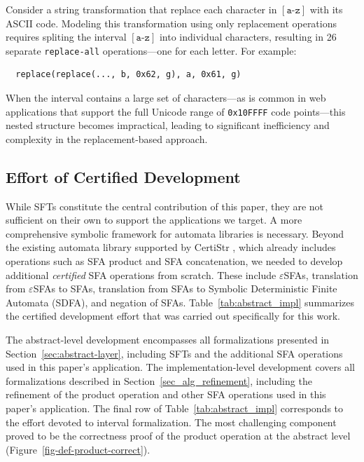 Consider a string transformation that replace each character in $[\texttt{a-z}]$ with its ASCII code. Modeling this transformation using only replacement operations requires spliting the interval $[\texttt{a-z}]$ into individual characters, resulting in 26 separate \texttt{replace-all} operations—one for each letter. For example:
\begin{verbatim}
  replace(replace(..., b, 0x62, g), a, 0x61, g)
\end{verbatim}


When the interval contains a large set of characters—as is common in web applications that support the full Unicode range of 
\texttt{0x10FFFF} code points—this nested structure becomes impractical, leading to significant inefficiency and complexity in the replacement-based approach.






\subsection{Effort of Certified Development}

While SFTs constitute the central contribution of this paper, they are not sufficient on their own to support the applications we target. A more comprehensive symbolic framework for automata libraries is necessary. Beyond the existing automata library supported by CertiStr \cite{cpp/KanLRS22}, which already includes operations such as SFA product and SFA concatenation, we needed to develop additional \emph{certified} SFA operations from scratch. These include $\varepsilon$SFAs, translation from $\varepsilon$SFAs to SFAs, translation from SFAs to Symbolic Deterministic Finite Automata (SDFA), and negation of SFAs. Table~\ref{tab:abstract_impl} summarizes the certified development effort that was carried out specifically for this work.

The abstract-level development encompasses all formalizations presented in Section~\ref{sec:abstract-layer}, including SFTs and the additional SFA operations used in this paper's application. The implementation-level development covers all formalizations described in Section~\ref{sec_alg_refinement}, including the refinement of the product operation and other SFA operations used in this paper's application. The final row of Table~\ref{tab:abstract_impl} corresponds to the effort devoted to interval formalization. The most challenging component proved to be the correctness proof of the product operation at the abstract level (Figure~\ref{fig-def-product-correct}).
%


